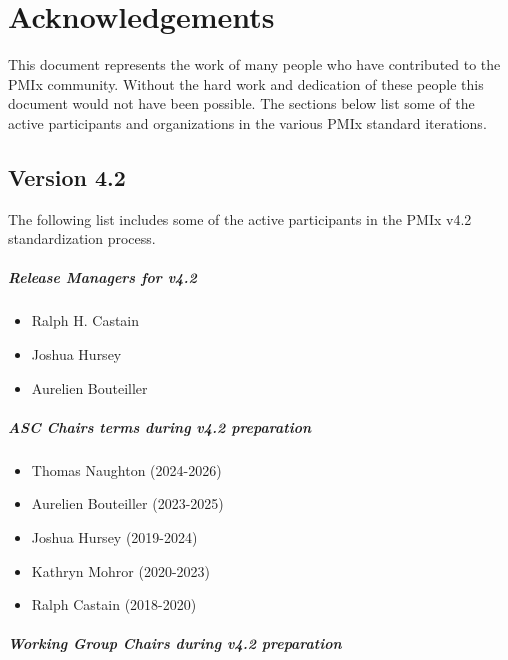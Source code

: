 \chapter{Acknowledgements}
\label{chap:acknowledgements}

This document represents the work of many people who have contributed to the PMIx community.
Without the hard work and dedication of these people this document would not have been possible.
The sections below list some of the active participants and organizations in the various PMIx standard iterations.

\section{Version 4.2}

The following list includes some of the active participants in the PMIx v4.2 standardization process.

\paragraph*{Release Managers for v4.2}

\begin{itemize}
    \item Ralph H. Castain
    \item Joshua Hursey
    \item Aurelien Bouteiller
\end{itemize}

\paragraph*{ASC Chairs terms during v4.2 preparation}

\begin{itemize}
    \item Thomas Naughton (2024-2026)
    \item Aurelien Bouteiller (2023-2025)
    \item Joshua Hursey (2019-2024)
    \item Kathryn Mohror (2020-2023)
    \item Ralph Castain (2018-2020)
\end{itemize}

\paragraph*{Working Group Chairs during v4.2 preparation}

